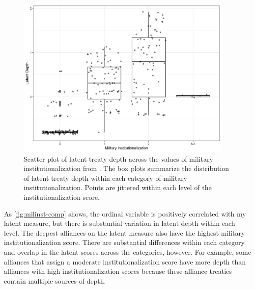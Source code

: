 \documentclass[12pt]{article}
\begin{document}
\begin{figure}[htbp]
	\centering
		\includegraphics[width=0.95\textwidth]{milinst-comp.png}
	\caption{Scatter plot of latent treaty depth across the values of military institutionalization from \citet{LeedsAnac2005}. The box plots summarize the distribution of latent treaty depth within each category of military institutionalization. Points are jittered within each level of the institutionalization score.}
	\label{fig:milinst-comp}
\end{figure} 


As \autoref{fig:milinst-comp} shows, the ordinal variable is positively correlated with my latent measure, but there is substantial variation in latent depth within each level. 
The deepest alliances on the latent measure also have the highest military institutionalization score.
There are substantial differences within each category and overlap in the latent scores across the categories, however. 
For example, some alliances that \citet{LeedsAnac2005} assign a moderate institutionalization score have more depth than alliances with high institutionalization scores because these alliance treaties contain multiple sources of depth. 
\end{document}
